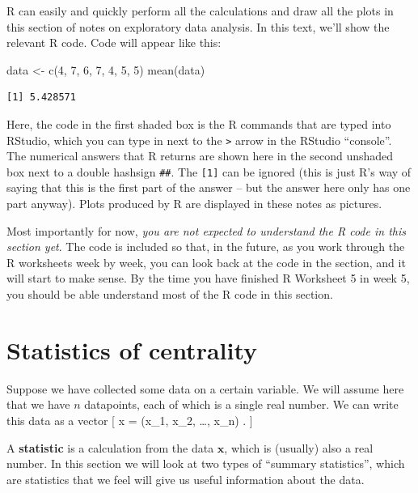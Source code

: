 \documentclass[
  letterpaper,
  DIV=11,
  numbers=noendperiod]{scrreprt}
\newenvironment{Shaded}{\begin{snugshade}}{\end{snugshade}}
\newcommand{\DecValTok}[1]{\textcolor[rgb]{0.68,0.00,0.00}{#1}}
\newcommand{\FunctionTok}[1]{\textcolor[rgb]{0.28,0.35,0.67}{#1}}
\newcommand{\NormalTok}[1]{\textcolor[rgb]{0.00,0.23,0.31}{#1}}
\newcommand{\OtherTok}[1]{\textcolor[rgb]{0.00,0.23,0.31}{#1}}
\theoremstyle{remark}
\begin{document}
R can easily and quickly perform all the calculations and draw all the
plots in this section of notes on exploratory data analysis. In this
text, we'll show the relevant R code. Code will appear like this:

\begin{Shaded}
\begin{Highlighting}[]
\NormalTok{data }\OtherTok{\textless{}{-}} \FunctionTok{c}\NormalTok{(}\DecValTok{4}\NormalTok{, }\DecValTok{7}\NormalTok{, }\DecValTok{6}\NormalTok{, }\DecValTok{7}\NormalTok{, }\DecValTok{4}\NormalTok{, }\DecValTok{5}\NormalTok{, }\DecValTok{5}\NormalTok{)}
\FunctionTok{mean}\NormalTok{(data)}
\end{Highlighting}
\end{Shaded}

\begin{verbatim}
[1] 5.428571
\end{verbatim}

Here, the code in the first shaded box is the R commands that are typed
into RStudio, which you can type in next to the \texttt{\textgreater{}}
arrow in the RStudio ``console''. The numerical answers that R returns
are shown here in the second unshaded box next to a double hashsign
\texttt{\#\#}. The \texttt{{[}1{]}} can be ignored (this is just R's way
of saying that this is the first part of the answer -- but the answer
here only has one part anyway). Plots produced by R are displayed in
these notes as pictures.

Most importantly for now, \emph{you are not expected to understand the R
code in this section yet}. The code is included so that, in the future,
as you work through the R worksheets week by week, you can look back at
the code in the section, and it will start to make sense. By the time
you have finished R Worksheet 5 in week 5, you should be able understand
most of the R code in this section.

\hypertarget{stat-central}{%
\section{Statistics of centrality}\label{stat-central}}

Suppose we have collected some data on a certain variable. We will
assume here that we have \(n\) datapoints, each of which is a single
real number. We can write this data as a vector {[} \mathbf x = (x\_1,
x\_2, \dots, x\_n) . {]}

A \textbf{statistic} is a calculation from the data \(\mathbf x\), which
is (usually) also a real number. In this section we will look at two
types of ``summary statistics'', which are statistics that we feel will
give us useful information about the data.
\end{document}
